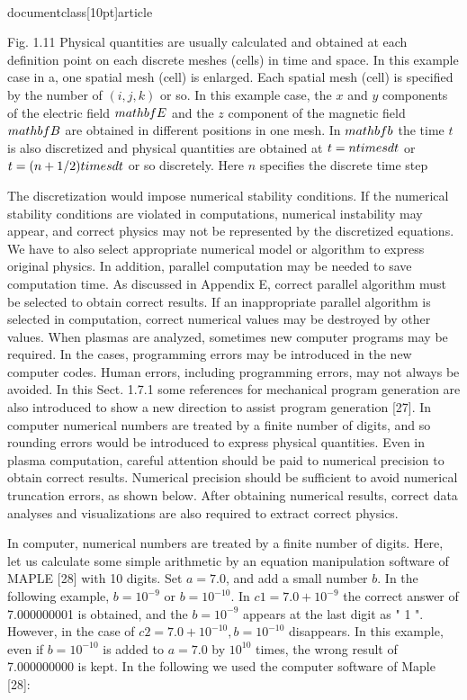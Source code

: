 \\documentclass[10pt]{article}
\begin{document}
Fig. 1.11 Physical quantities are usually calculated and obtained at each definition point on each discrete meshes (cells) in time and space. In this example case in a, one spatial mesh (cell) is enlarged. Each spatial mesh (cell) is specified by the number of $(i, j, k)$ or so. In this example case, the $x$ and $y$ components of the electric field $\\mathbf{E}$ and the $z$ component of the magnetic field $\\mathbf{B}$ are obtained in different positions in one mesh. In $\\mathbf{b}$ the time $t$ is also discretized and physical quantities are obtained at $t=n \\times d t$ or $t=(n+1 / 2) \\times d t$ or so discretely. Here $n$ specifies the discrete time step

The discretization would impose numerical stability conditions. If the numerical stability conditions are violated in computations, numerical instability may appear, and correct physics may not be represented by the discretized equations. We have to also select appropriate numerical model or algorithm to express original physics. In addition, parallel computation may be needed to save computation time. As discussed in Appendix E, correct parallel algorithm must be selected to obtain correct results. If an inappropriate parallel algorithm is selected in computation, correct numerical values may be destroyed by other values. When plasmas are analyzed, sometimes
new computer programs may be required. In the cases, programming errors may be introduced in the new computer codes. Human errors, including programming errors, may not always be avoided. In this Sect. 1.7.1 some references for mechanical program generation are also introduced to show a new direction to assist program generation [27]. In computer numerical numbers are treated by a finite number of digits, and so rounding errors would be introduced to express physical quantities. Even in plasma computation, careful attention should be paid to numerical precision to obtain correct results. Numerical precision should be sufficient to avoid numerical truncation errors, as shown below. After obtaining numerical results, correct data analyses and visualizations are also required to extract correct physics.

In computer, numerical numbers are treated by a finite number of digits. Here, let us calculate some simple arithmetic by an equation manipulation software of MAPLE [28] with 10 digits. Set $a=7.0$, and add a small number $b$. In the following example, $b=10^{-9}$ or $b=10^{-10}$. In $c 1=7.0+10^{-9}$ the correct answer of 7.000000001 is obtained, and the $b=10^{-9}$ appears at the last digit as " 1 ". However, in the case of $c 2=7.0+10^{-10}, b=10^{-10}$ disappears. In this example, even if $b=10^{-10}$ is added to $a=7.0$ by $10^{10}$ times, the wrong result of 7.000000000 is kept. In the following we used the computer software of Maple [28]:
\end{document}
